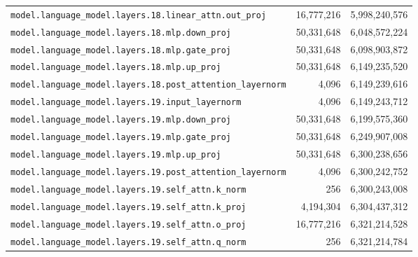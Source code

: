 \documentclass[10pt,a4paper]{article}
\theoremstyle{definition}
\begin{document}
\begin{appendices}
\begin{longtable}{p{9.5cm}rr}
\texttt{model.\allowbreak{}language\_model.\allowbreak{}layers.\allowbreak{}18.\allowbreak{}linear\_attn.\allowbreak{}out\_proj} & 16,777,216 & 5,998,240,576 \\
\texttt{model.\allowbreak{}language\_model.\allowbreak{}layers.\allowbreak{}18.\allowbreak{}mlp.\allowbreak{}down\_proj} & 50,331,648 & 6,048,572,224 \\
\texttt{model.\allowbreak{}language\_model.\allowbreak{}layers.\allowbreak{}18.\allowbreak{}mlp.\allowbreak{}gate\_proj} & 50,331,648 & 6,098,903,872 \\
\texttt{model.\allowbreak{}language\_model.\allowbreak{}layers.\allowbreak{}18.\allowbreak{}mlp.\allowbreak{}up\_proj} & 50,331,648 & 6,149,235,520 \\
\texttt{model.\allowbreak{}language\_model.\allowbreak{}layers.\allowbreak{}18.\allowbreak{}post\_attention\_layernorm} & 4,096 & 6,149,239,616 \\
\texttt{model.\allowbreak{}language\_model.\allowbreak{}layers.\allowbreak{}19.\allowbreak{}input\_layernorm} & 4,096 & 6,149,243,712 \\
\texttt{model.\allowbreak{}language\_model.\allowbreak{}layers.\allowbreak{}19.\allowbreak{}mlp.\allowbreak{}down\_proj} & 50,331,648 & 6,199,575,360 \\
\texttt{model.\allowbreak{}language\_model.\allowbreak{}layers.\allowbreak{}19.\allowbreak{}mlp.\allowbreak{}gate\_proj} & 50,331,648 & 6,249,907,008 \\
\texttt{model.\allowbreak{}language\_model.\allowbreak{}layers.\allowbreak{}19.\allowbreak{}mlp.\allowbreak{}up\_proj} & 50,331,648 & 6,300,238,656 \\
\texttt{model.\allowbreak{}language\_model.\allowbreak{}layers.\allowbreak{}19.\allowbreak{}post\_attention\_layernorm} & 4,096 & 6,300,242,752 \\
\texttt{model.\allowbreak{}language\_model.\allowbreak{}layers.\allowbreak{}19.\allowbreak{}self\_attn.\allowbreak{}k\_norm} & 256 & 6,300,243,008 \\
\texttt{model.\allowbreak{}language\_model.\allowbreak{}layers.\allowbreak{}19.\allowbreak{}self\_attn.\allowbreak{}k\_proj} & 4,194,304 & 6,304,437,312 \\
\texttt{model.\allowbreak{}language\_model.\allowbreak{}layers.\allowbreak{}19.\allowbreak{}self\_attn.\allowbreak{}o\_proj} & 16,777,216 & 6,321,214,528 \\
\texttt{model.\allowbreak{}language\_model.\allowbreak{}layers.\allowbreak{}19.\allowbreak{}self\_attn.\allowbreak{}q\_norm} & 256 & 6,321,214,784 \\

\end{longtable}
\end{appendices}
\end{document}
